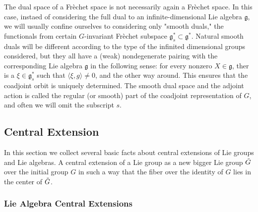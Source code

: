 \begin{rmk}

	The dual space of a Fr\`echet space is not necessarily again a Fr\`echet space. In this case, instaed of considering the full dual to an infinite-dimensional Lie algebra $ \mathfrak{g}$, we will usually confine ourselves to considering only "smooth duals," the functionals from certain $G$-invariant Fr\`echet subspace $ \mathfrak{g}^*_s \subset \mathfrak{g}^*$. Natural smooth duals will be different according to the type of the infinited dimensional groups considered, but they all have a (weak) nondegenerate pairing with the corresponding Lie algebra $ \mathfrak{g}$ in the following sense: for every nonzero $X \in \mathfrak{g}$, ther is a $\xi \in \mathfrak{g}^*_s$ such that $\langle \xi, g \rangle \neq 0$, and the other way around. This ensures that the coadjoint orbit is uniquely determined. The smooth dual space and the adjoint action is called the regular (or smooth) part of the coadjoint representation of $G$, and often we will omit the subscript $s$.

\end{rmk}


\subsection{Central Extension}

In this section we collect several basic facts about central extensions of Lie groups and Lie algebras. A central extension of a Lie group as a new bigger Lie group $\Tilde{G}$ over the initial group $G$ in such a way that the fiber over the identity of $G$ lies in the center of $\Tilde{G}$. \\

\subsubsection{Lie Algebra Central Extensions}



